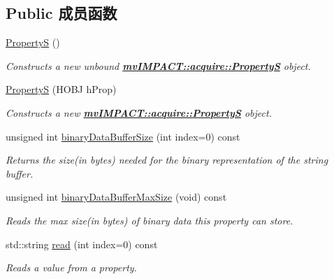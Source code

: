 \subsection*{Public 成员函数}
\begin{DoxyCompactItemize}
\item 
\hypertarget{classmv_i_m_p_a_c_t_1_1acquire_1_1_property_s_a8eb6a914fbae996d11bbed5d6e43e86b}{\hyperlink{classmv_i_m_p_a_c_t_1_1acquire_1_1_property_s_a8eb6a914fbae996d11bbed5d6e43e86b}{Property\+S} ()}\label{classmv_i_m_p_a_c_t_1_1acquire_1_1_property_s_a8eb6a914fbae996d11bbed5d6e43e86b}

\begin{DoxyCompactList}\small\item\em Constructs a new unbound {\bfseries \hyperlink{classmv_i_m_p_a_c_t_1_1acquire_1_1_property_s}{mv\+I\+M\+P\+A\+C\+T\+::acquire\+::\+Property\+S}} object. \end{DoxyCompactList}\item 
\hyperlink{classmv_i_m_p_a_c_t_1_1acquire_1_1_property_s_ab4a20d4e6f7af0c908a93923bff87cf8}{Property\+S} (H\+O\+B\+J h\+Prop)
\begin{DoxyCompactList}\small\item\em Constructs a new {\bfseries \hyperlink{classmv_i_m_p_a_c_t_1_1acquire_1_1_property_s}{mv\+I\+M\+P\+A\+C\+T\+::acquire\+::\+Property\+S}} object. \end{DoxyCompactList}\item 
unsigned int \hyperlink{classmv_i_m_p_a_c_t_1_1acquire_1_1_property_s_a8fe526b2493641d5bdc79e20429f73c8}{binary\+Data\+Buffer\+Size} (int index=0) const 
\begin{DoxyCompactList}\small\item\em Returns the size(in bytes) needed for the binary representation of the string buffer. \end{DoxyCompactList}\item 
unsigned int \hyperlink{classmv_i_m_p_a_c_t_1_1acquire_1_1_property_s_a8d0247ac6a035407c0ba751bc23ac016}{binary\+Data\+Buffer\+Max\+Size} (void) const 
\begin{DoxyCompactList}\small\item\em Reads the max size(in bytes) of binary data this property can store. \end{DoxyCompactList}\item 
std\+::string \hyperlink{classmv_i_m_p_a_c_t_1_1acquire_1_1_property_s_a2cdfba8b36daf2435e4047573a6acf95}{read} (int index=0) const 
\begin{DoxyCompactList}\small\item\em Reads a value from a property. \end{DoxyCompactList}\item 

\end{DoxyCompactItemize}

